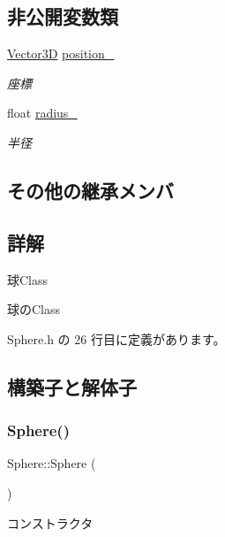 \subsection*{非公開変数類}
\begin{DoxyCompactItemize}
\item 
\mbox{\hyperlink{class_vector3_d}{Vector3D}} \mbox{\hyperlink{class_sphere_a5a18bfcc7abcdfbd6802ec622dfa5590}{position\+\_\+}}
\begin{DoxyCompactList}\small\item\em 座標 \end{DoxyCompactList}\item 
float \mbox{\hyperlink{class_sphere_ac2924d9ad22bfad1ed1914c069c188dc}{radius\+\_\+}}
\begin{DoxyCompactList}\small\item\em 半径 \end{DoxyCompactList}\end{DoxyCompactItemize}
\subsection*{その他の継承メンバ}


\subsection{詳解}
球\+Class 

球の\+Class 

 Sphere.\+h の 26 行目に定義があります。



\subsection{構築子と解体子}
\mbox{\label{class_sphere_a890a63ff583cb88e7ec4e840b4ef5eb9}} 
\subsubsection{\texorpdfstring{Sphere()}{Sphere()}}
{\footnotesize\ttfamily Sphere\+::\+Sphere (\begin{DoxyParamCaption}{ }\end{DoxyParamCaption})\hspace{0.3cm}{\ttfamily [inline]}}



コンストラクタ 


